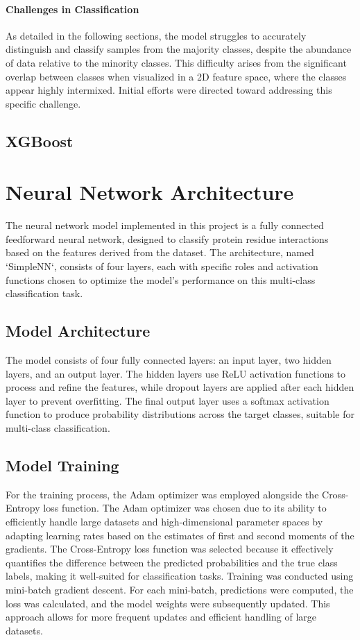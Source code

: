 \documentclass[10pt,twocolumn,letterpaper]{article}
\begin{document}
\paragraph{Challenges in Classification}
As detailed in the following sections, the model struggles to accurately distinguish and classify samples from the majority classes, despite the abundance of data relative to the minority classes. This difficulty arises from the significant overlap between classes when visualized in a 2D feature space, where the classes appear highly intermixed. Initial efforts were directed toward addressing this specific challenge.



\subsection{XGBoost}
\section{Neural Network Architecture}

The neural network model implemented in this project is a fully connected feedforward neural network, designed to classify protein residue interactions based on the features derived from the dataset. The architecture, named `SimpleNN`, consists of four layers, each with specific roles and activation functions chosen to optimize the model's performance on this multi-class classification task.

\subsection{Model Architecture}

The model consists of four fully connected layers: an input layer, two hidden layers, and an output layer. The hidden layers use ReLU activation functions to process and refine the features, while dropout layers are applied after each hidden layer to prevent overfitting. The final output layer uses a softmax activation function to produce probability distributions across the target classes, suitable for multi-class classification.

\subsection{Model Training}

For the training process, the Adam optimizer was employed alongside the Cross-Entropy loss function. 
The Adam optimizer was chosen due to its ability to efficiently handle large datasets and high-dimensional parameter spaces by adapting learning rates based on the estimates of first and second moments of the gradients. 
The Cross-Entropy loss function was selected because it effectively quantifies the difference between the predicted probabilities and the true class labels, making it well-suited for classification tasks.
Training was conducted using mini-batch gradient descent. 
For each mini-batch, predictions were computed, the loss was calculated, and the model weights were subsequently updated. This approach allows for more frequent updates and efficient handling of large datasets.
\end{document}

